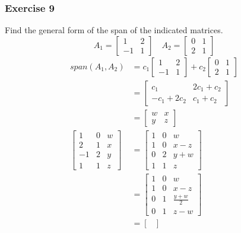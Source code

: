 \documentclass{math}
\begin{document}
\subsubsection*{Exercise 9}
Find the general form of the span of the indicated matrices.
\[ A_1 = \begin{bmatrix}1 & 2 \\ -1 & 1\end{bmatrix} \quad
  A_2 = \begin{bmatrix}0 & 1 \\ 2 & 1\end{bmatrix} \]
\begin{align*}
  span(A_1,A_2) &= c_1\begin{bmatrix}1 & 2 \\ -1 & 1\end{bmatrix}+
    c_2\begin{bmatrix}0 & 1 \\ 2 & 1\end{bmatrix} \\
  &= \begin{bmatrix}
    c_1 & 2c_1+c_2 \\
    -c_1+2c_2 & c_1+c_2
  \end{bmatrix} \\
  &= \begin{bmatrix}
    w & x \\
    y & z
  \end{bmatrix} \\
  \left[\begin{array}{cc|c}
    1 & 0 & w \\
    2 & 1 & x \\
    -1 & 2 & y \\
    1 & 1 & z
  \end{array}\right] &= \begin{bmatrix}
    1 & 0 & w \\
    1 & 0 & x-z \\
    0 & 2 & y+w \\
    1 & 1 & z
  \end{bmatrix} \\
  &= \begin{bmatrix}
    1 & 0 & w \\
    1 & 0 & x-z \\
    0 & 1 & \frac{y+w}{2} \\
    0 & 1 & z-w
  \end{bmatrix} \\
  &= \begin{bmatrix}

\end{bmatrix}
\end{align*}
\end{document}
